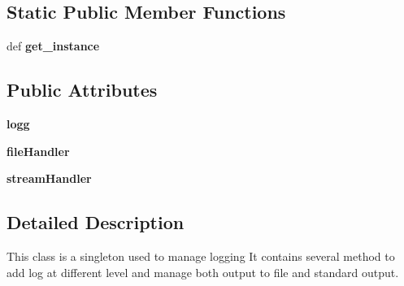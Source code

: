 \subsection*{Static Public Member Functions}
\begin{DoxyCompactItemize}
\item 
\hypertarget{classsrc_1_1fr_1_1tagc_1_1rainet_1_1core_1_1util_1_1log_1_1Logger_1_1Logger_a3f0abad51db7adca1c39eaa1be8c9fe7}{def {\bfseries get\-\_\-instance}}\label{classsrc_1_1fr_1_1tagc_1_1rainet_1_1core_1_1util_1_1log_1_1Logger_1_1Logger_a3f0abad51db7adca1c39eaa1be8c9fe7}

\end{DoxyCompactItemize}
\subsection*{Public Attributes}
\begin{DoxyCompactItemize}
\item 
\hypertarget{classsrc_1_1fr_1_1tagc_1_1rainet_1_1core_1_1util_1_1log_1_1Logger_1_1Logger_a4602026d1e48039f2ba504e357c095aa}{{\bfseries logg}}\label{classsrc_1_1fr_1_1tagc_1_1rainet_1_1core_1_1util_1_1log_1_1Logger_1_1Logger_a4602026d1e48039f2ba504e357c095aa}

\item 
\hypertarget{classsrc_1_1fr_1_1tagc_1_1rainet_1_1core_1_1util_1_1log_1_1Logger_1_1Logger_ab0f58209e1de80c1f104cacfd1ae54b9}{{\bfseries file\-Handler}}\label{classsrc_1_1fr_1_1tagc_1_1rainet_1_1core_1_1util_1_1log_1_1Logger_1_1Logger_ab0f58209e1de80c1f104cacfd1ae54b9}

\item 
\hypertarget{classsrc_1_1fr_1_1tagc_1_1rainet_1_1core_1_1util_1_1log_1_1Logger_1_1Logger_a4d3ced58e204871da24a3b570edb9c53}{{\bfseries stream\-Handler}}\label{classsrc_1_1fr_1_1tagc_1_1rainet_1_1core_1_1util_1_1log_1_1Logger_1_1Logger_a4d3ced58e204871da24a3b570edb9c53}

\end{DoxyCompactItemize}


\subsection{Detailed Description}
This class is a singleton used to manage logging It contains several method to add log at different level and manage both output to file and standard output. 

